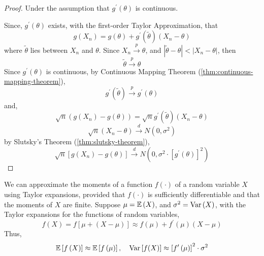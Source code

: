 \begin{proof}
	Under the assumption that $g^{\prime}(\theta)$ is continuous.

	Since, $g^{\prime}(\theta)$ exists, with the first-order Taylor Approximation, that
	\begin{equation*}
		g(X_n)=g(\theta)+g^{\prime}(\tilde{\theta})(X_n-\theta)
	\end{equation*}
	where $\tilde{\theta}$ lies between $X_n$ and $\theta$.
	Since $X_n\stackrel{p}{\rightarrow}\theta$, and $|\tilde{\theta}-\theta|<|X_n-\theta|$, then
	\begin{equation*}
		\tilde{\theta}\stackrel{p}{\rightarrow}\theta
	\end{equation*}
	Since $g^{\prime}(\theta)$ is continuous, by Continuous Mapping Theorem (\ref{thm:continuous-mapping-theorem}),
	\begin{equation*}
		g^{\prime}(\tilde{\theta})\stackrel{p}{\rightarrow}g^{\prime}(\theta)
	\end{equation*}
	and,
	\begin{equation*}
		\sqrt{n}\left(g(X_n)-g(\theta)\right)=\sqrt{n}g^{\prime}(\tilde{\theta})(X_n-\theta)
	\end{equation*}
	\begin{equation*}
		\sqrt{n}\left(X_{n}-\theta\right)\stackrel{d}{\rightarrow}N\left(0,\sigma^{2}\right)
	\end{equation*}
	by Slutsky's Theorem (\ref{thm:slutsky-theorem}),
	\begin{equation*}
		\sqrt{n}\left[g\left(X_{n}\right)-g(\theta)\right] \stackrel{d}{\rightarrow}N\left(0,\sigma^{2}\cdot\left[g^{\prime}(\theta)\right]^{2}\right)
	\end{equation*}
\end{proof}

\begin{theorem}

\end{theorem}

\begin{remark}
	We can approximate the moments of a function $f(\cdot)$ of a random variable $X$ using Taylor expansions, provided that $f(\cdot)$ is sufficiently differentiable and that the moments of $X$ are finite. Suppose $\mu={\mathbb E}\left(X\right)$, and $\sigma^{2}=\mathrm{Var}\left(X\right)$, with the Taylor expansions for the functions of random variables,
	\begin{equation}
		f\left(X\right)=f\left[\mu+\left(X-\mu\right)\right]\approx f\left(\mu\right)+f^{\prime}\left(\mu\right)\left(X-\mu\right)
	\end{equation}
	Thus,
	\begin{equation}
		{\mathbb E}\left[f\left(X\right)\right]\approx{\mathbb E}\left[f\left(\mu\right)\right],\quad\mathrm{Var}\left[f(X)\right]\approx\left[f^{\prime}\left(\mu\right)\right]^{2}\cdot\sigma^{2}
	\end{equation}
\end{remark}

